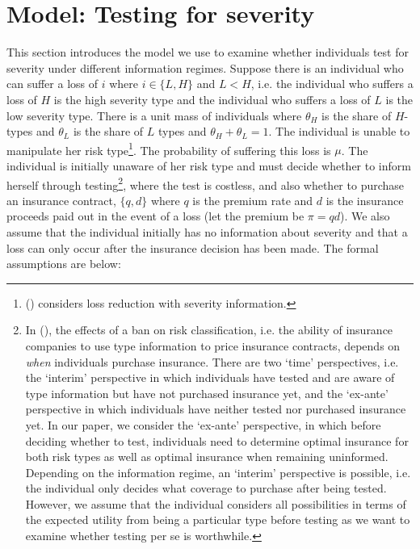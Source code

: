 \documentclass[natbib=false,preprint,12pt]{elsarticle}
\theoremstyle{plain}
\theoremstyle{definition}
\theoremstyle{plain}
\theoremstyle{TheoremNum}
\theoremstyle{CorollaryNum}
\theoremstyle{PropositionNum}
\theoremstyle{TheoremNum}
\begin{document}
\section{Model: Testing for severity}
This section introduces the model we use to examine whether individuals test for severity under different information regimes. Suppose there is an individual who can suffer a loss of $i$ where $i \in \{L,H\}$ and $L<H$, i.e. the individual who suffers a loss of $H$ is the high severity type and the individual who suffers a loss of $L$ is the low severity type. There is a unit mass of individuals where $\theta_H$ is the share of $H$-types and $\theta_L$ is the share of $L$ types and $\theta_H + \theta_L = 1$. The individual is unable to manipulate her risk type\footnote{\citeauthor{tan2025testing} (\citeyear{tan2025testing}) considers loss reduction with severity information.}. The probability of suffering this loss is $\mu$. The individual is initially unaware of her risk type and must decide whether to inform herself through testing\footnote{In \citeauthor{dionne2014economic} (\citeyear{dionne2014economic}), the effects of a ban on risk classification, i.e. the ability of insurance companies to use type information to price insurance contracts, depends on \textit{when} individuals purchase insurance. There are two `time' perspectives, i.e. the `interim' perspective in which individuals have tested and are aware of type information but have not purchased insurance yet, and the `ex-ante' perspective in which individuals have neither tested nor purchased insurance yet. In our paper, we consider the `ex-ante' perspective, in which before deciding whether to test, individuals need to determine optimal insurance for both risk types as well as optimal insurance when remaining uninformed. Depending on the information regime, an `interim' perspective is possible, i.e. the individual only decides what coverage to purchase after being tested. However, we assume that the individual considers all possibilities in terms of the expected utility from being a particular type before testing as we want to examine whether testing per se is worthwhile.}, where the test is costless, and also whether to purchase an insurance contract, $\{q,d\}$ where $q$ is the premium rate and $d$ is the insurance proceeds paid out in the event of a loss (let the premium be $\pi = qd$). We also assume that the individual initially has no information about severity and that a loss can only occur after the insurance decision has been made. The formal assumptions are below:
\end{document}
